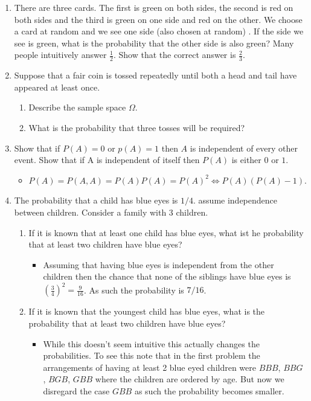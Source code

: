 \documentclass{article}
\begin{document}
\begin{enumerate}
	\item There are three cards. The first is green on both sides, the second is red on both sides and the third is green on one side and red on the other. We choose a card at random and we see one side (also chosen at random) . If the side we see is green, what is the probability that the other side is also green? Many people intuitively answer $\frac{1}{2}$. Show that the correct answer is $\frac{2}{3}$.
	\item Suppose that a fair coin is tossed repeatedly until both a head and tail have appeared at least once.
		\begin{enumerate}
			\item Describe the sample space $\Omega$.
			\item What is the probability that three tosses will be required?
		\end{enumerate}
	\item Show that if $P(A) = 0$ or $p(A) = 1$ then $A$ is independent of every other event. Show that if A is independent of itself then $P(A)$ is either $0$ or $1$.
		\begin{itemize}
			\item $P(A) = P(A, A) = P(A)P(A) = P(A)^2 \iff P(A)(P(A) - 1).$
		\end{itemize}
	\item The probability that a child has blue eyes is $1 / 4$. assume independence between children. Consider a family with $3$ children.
		\begin{enumerate}
			\item If it is known that at least one child has blue eyes, what ist he probability that at least two children have blue eyes?
				\begin{itemize}
					\item Assuming that having blue eyes is independent from the other children then the chance that none of the siblings have blue eyes is $\left(\frac{3}{4}\right)^2 = \frac{9}{16}$. As such the probability is $7 / 16$. 
				\end{itemize}
			\item If it is known that the youngest child has blue eyes, what is the probability that at least two children have blue eyes?
				\begin{itemize}
					\item While this doesn't seem intuitive this actually changes the probabilities. To see this note that in the first problem the arrangements of having at least 2 blue eyed children were $BBB$, $BBG$, $BGB$, $GBB$ where the children are ordered by age. But now we disregard the case $GBB$ as such the probability becomes smaller.

\end{itemize}
\end{enumerate}
\end{enumerate}
\end{document}
